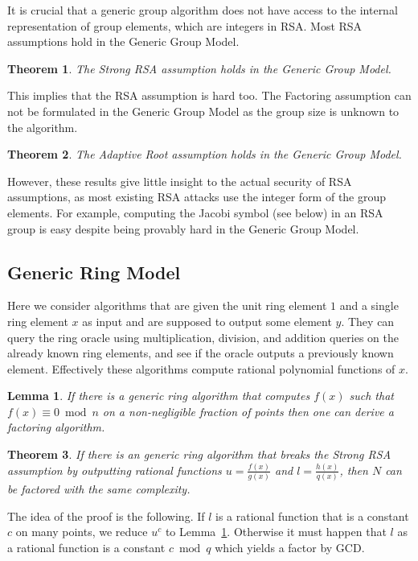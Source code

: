 \documentclass[a4paper]{article}
\newtheorem{theorem}{Theorem}
\newtheorem{lemma}{Lemma}
\begin{document}
It is crucial that a generic group algorithm does not have access to the internal representation of group elements, which are integers in RSA. 
Most RSA assumptions hold in the Generic Group Model. 
\begin{theorem}\cite{DBLP:conf/eurocrypt/DamgardK02}
The Strong RSA assumption holds in the Generic Group Model.
\end{theorem}
This implies that the RSA assumption is hard too. The Factoring assumption can not be formulated in the Generic Group Model as the group size is unknown to the algorithm.
\begin{theorem}\cite{cryptoeprint:2019:1229}
The Adaptive Root assumption holds in the Generic Group Model.
\end{theorem}
However, these results give little insight to the actual security of RSA assumptions, as most existing RSA attacks use the integer form of the group elements. For example, computing the Jacobi symbol (see below) in an RSA group is easy despite being provably hard in the Generic Group Model.

\subsection{Generic Ring Model}

Here we consider algorithms that are given the unit ring element $1$ and a single ring element $x$ as input and are supposed to output some element $y$. They can query the ring oracle using multiplication, division, and addition queries on the already known ring elements, and see if the oracle outputs a previously known element. Effectively these algorithms compute rational polynomial functions of $x$.

\begin{lemma}\cite{DBLP:conf/eurocrypt/AggarwalM09}\label{ref:lem1}
If there is a generic ring algorithm that computes $f(x)$ such that $f(x)\equiv 0 \bmod{n}$ on a non-negligible fraction of points then one can derive a factoring algorithm.
\end{lemma}

\begin{theorem}\cite{aggarwal2011equivalence}
If there is an generic ring algorithm that breaks the Strong RSA assumption by outputting rational functions $u=\frac{f(x)}{g(x)}$ and $l=\frac{h(x)}{q(x)}$, then $N$ can be factored with the same complexity.
\end{theorem}
The idea of the proof is the following. If $l$ is a rational function that is a constant $c$ on many points, we reduce $u^c$ to Lemma~\ref{ref:lem1}. Otherwise it must happen that $l$ as a rational function is a constant $c\bmod{q}$ which yields a factor by GCD.
\end{document}
